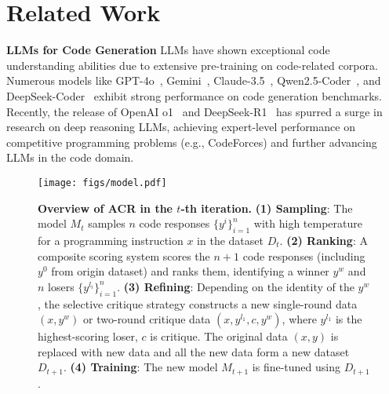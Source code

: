 \section{Related Work}
\textbf{LLMs for Code Generation} LLMs have shown exceptional code understanding abilities due to extensive pre-training on code-related corpora. Numerous models like GPT-4o~\cite{gpt4o-blog}, Gemini~\cite{gemini-blog}, Claude-3.5~\cite{claude3p5-blog}, Qwen2.5-Coder~\cite{hui2024qwen2}, and DeepSeek-Coder~\cite{guo2024deepseek} exhibit strong performance on code generation benchmarks. Recently, the release of OpenAI o1~\cite{o1-blog} and DeepSeek-R1~\cite{2025deepseekr1} has spurred a surge in research on deep reasoning LLMs, achieving expert-level performance on competitive programming problems (e.g., CodeForces) and further advancing LLMs in the code domain.




\begin{figure*}[t]
    \centering
    \texttt{[image: figs/model.pdf]}
    \caption{\textbf{Overview of ACR in the $t$-th iteration.} \textbf{(1) Sampling}: The model $M_t$ samples $n$ code responses $\{y^{i}\}_{i=1}^n$ with high temperature for a programming instruction $x$ in the dataset $D_t$. \textbf{(2) Ranking}: A composite scoring system scores the $n+1$ code responses (including $y^0$ from origin dataset) and ranks them, identifying a winner $y^w$ and $n$ losers $\{y^{l_i}\}_{i=1}^n$. \textbf{(3) Refining}: Depending on the identity of the $y^w$, the selective critique strategy constructs a new single-round data $(x,y^w)$ or two-round critique data $(x, y^{l_1}, c, y^w)$, where $y^{l_1}$ is the highest-scoring loser, $c$ is critique. The original data $(x, y)$ is replaced with new data and all the new data form a new dataset $D_{t+1}$. \textbf{(4) Training}: The new model $M_{t+1}$ is fine-tuned using $D_{t+1}$.}
	\label{method:model}
\end{figure*}




